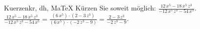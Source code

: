 \begin{MAufgabe}{Kuerzen}{kr, dh, MaTeX}
K\"urzen Sie soweit m\"oglich: $\frac{12\, x^5 - 18\, x^5\, z^3}{ - 12\, x^5\, z^3 - 54\, x^5}$.\\ 
\ifLsg\MLoesung
\quad $\frac{12\, x^5 - 18\, x^5\, z^3}{ - 12\, x^5\, z^3 - 54\, x^5}=\frac{(6\, x^5)\cdot(2 - 3\, z^3)}{(6\, x^5)\cdot( - 2\, z^3 - 9)}=\frac{2 - 3\, z^3}{ - 2\, z^3 - 9}$.\else\relax\fi
 \end{MAufgabe}